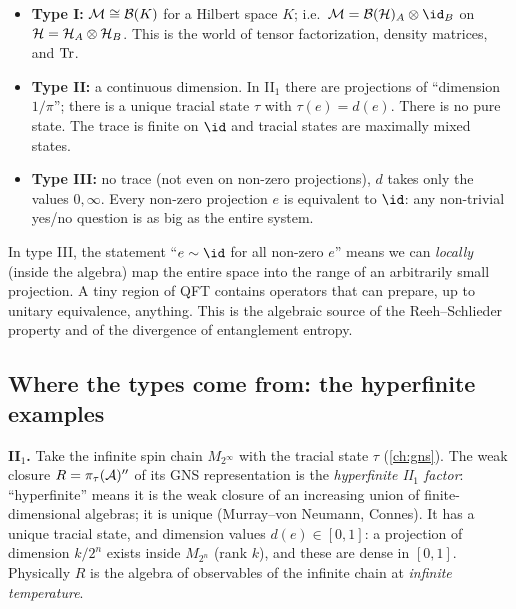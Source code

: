 \begin{itemize}
\item \textbf{Type I:} $\mathcal{M}\cong\mathcal{B}(K)$ for a Hilbert space $K$; i.e.\ $\M=\BH_A\otimes\id_B$ on $\mathcal{H}=\mathcal{H}_A\otimes\mathcal{H}_B$. This is the world of tensor factorization, density matrices, and $\operatorname{Tr}$.
\item \textbf{Type II:} a continuous dimension. In II$_1$ there are projections of ``dimension $1/\pi$''; there is a unique tracial state $\tau$ with $\tau(e)=d(e)$. There is no pure state. The trace is finite on $\id$ and tracial states are maximally mixed states.
\item \textbf{Type III:} no trace (not even on non-zero projections), $d$ takes only the values $0,\infty$. Every non-zero projection $e$ is equivalent to $\id$: any non-trivial yes/no question is as big as the entire system.
\end{itemize}

\begin{whatwrong}
In type III, the statement ``$e\sim\id$ for all non-zero $e$'' means we can \emph{locally} (inside the algebra) map the entire space into the range of an arbitrarily small projection. A tiny region of QFT contains operators that can prepare, up to unitary equivalence, anything. This is the algebraic source of the Reeh--Schlieder property and of the divergence of entanglement entropy.
\end{whatwrong}

\subsection{Where the types come from: the hyperfinite examples}

\textbf{II$_1$.} Take the infinite spin chain $M_{2^\infty}$ with the tracial state $\tau$ (\cref{ch:gns}). The weak closure $R=\pi_\tau(\mathcal{A})''$ of its GNS representation is the \emph{hyperfinite II$_1$ factor}: ``hyperfinite'' means it is the weak closure of an increasing union of finite-dimensional algebras; it is unique (Murray--von Neumann, Connes). It has a unique tracial state, and dimension values $d(e)\in[0,1]$: a projection of dimension $k/2^n$ exists inside $M_{2^n}$ (rank $k$), and these are dense in $[0,1]$. Physically $R$ is the algebra of observables of the infinite chain at \emph{infinite temperature}.

